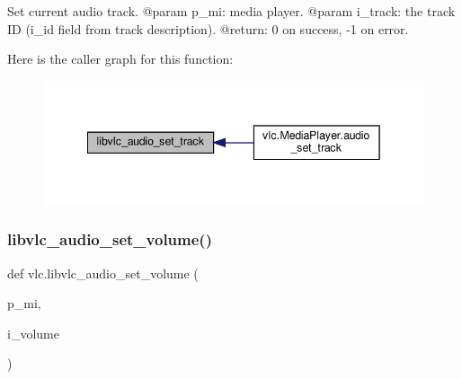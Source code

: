 \begin{DoxyVerb}Set current audio track.
@param p_mi: media player.
@param i_track: the track ID (i_id field from track description).
@return: 0 on success, -1 on error.
\end{DoxyVerb}
 Here is the caller graph for this function\+:
\nopagebreak
\begin{figure}[H]
\begin{center}
\leavevmode
\includegraphics[width=342pt]{namespacevlc_a98ac26f41a3d8271d1ec63d4a5c40289_icgraph}
\end{center}
\end{figure}
\mbox{\label{namespacevlc_a29afce2ad9d6cc26546b735653fe67b7}} 
\subsubsection{\texorpdfstring{libvlc\+\_\+audio\+\_\+set\+\_\+volume()}{libvlc\_audio\_set\_volume()}}
{\footnotesize\ttfamily def vlc.\+libvlc\+\_\+audio\+\_\+set\+\_\+volume (\begin{DoxyParamCaption}\item[{}]{p\+\_\+mi,  }\item[{}]{i\+\_\+volume }\end{DoxyParamCaption})}

